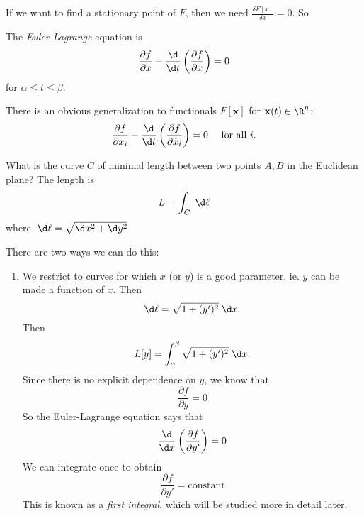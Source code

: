 \documentclass[a4paper]{article}
\begin{document}
If we want to find a stationary point of $F$, then we need $\frac{\delta F[x]}{\delta x} = 0$. So
\begin{defi}
  The \emph{Euler-Lagrange} equation is
  \[
    \frac{\partial f}{\partial x} - \frac{\d}{\d t}\left(\frac{\partial f}{\partial \dot{x}}\right) = 0
  \]
  for $\alpha \leq t \leq \beta$.
\end{defi}
There is an obvious generalization to functionals $F[\mathbf{x}]$ for $\mathbf{x}(t) \in \R^n$:
\[
  \frac{\partial f}{\partial x_i} - \frac{\d }{\d t}\left(\frac{\partial f}{\partial \dot{x}_i}\right) = 0 \quad\text{ for all }i.
\]
\begin{eg}
  What is the curve $C$ of minimal length between two points $A, B$ in the Euclidean plane? The length is
  \[
    L = \int_C \;\d \ell
  \]
  where $\;\d \ell = \sqrt{\d x^2 + \d y^2}$.

  There are two ways we can do this:
  \begin{enumerate}
    \item We restrict to curves for which $x$ (or $y$) is a good parameter, ie. $y$ can be made a function of $x$. Then
      \[
        \d \ell = \sqrt{1 + (y')^2}\;\d x.
      \]
      Then
      \[
        L[y] = \int_\alpha^\beta \sqrt{1 + (y')^2}\;\d x.
      \]
      Since there is no explicit dependence on $y$, we know that
      \[
        \frac{\partial f}{\partial y} = 0
      \]
      So the Euler-Lagrange equation says that
      \[
        \frac{\d}{\d x} \left(\frac{\partial f}{\partial y'}\right) = 0
      \]
      We can integrate once to obtain
      \[
        \frac{\partial f}{\partial y'} = \text{constant}
      \]
      This is known as a \emph{first integral}, which will be studied more in detail later.


\end{enumerate}
\end{eg}
\end{document}

